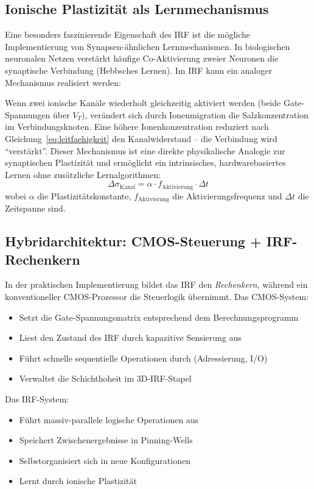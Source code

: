 ﻿\documentclass[a4paper,12pt]{scrreprt}
\theoremstyle{definition}
\begin{document}
\subsection{Ionische Plastizität als Lernmechanismus}

Eine besonders faszinierende Eigenschaft des IRF ist die mögliche Implementierung
von Synapsen-ähnlichen Lernmechanismen. In biologischen neuronalen Netzen
verstärkt häufige Co-Aktivierung zweier Neuronen die synaptische Verbindung
(Hebbsches Lernen). Im IRF kann ein analoger Mechanismus realisiert werden:

Wenn zwei ionische Kanäle wiederholt gleichzeitig aktiviert werden (beide
Gate-Span\-nungen über $V_T$), verändert sich durch Ionenmigration die
Salzkonzentration im Verbindungsknoten. Eine höhere Ionenkonzentration
reduziert nach Gleichung~\eqref{eq:leitfaehigkeit} den Kanalwiderstand --
die Verbindung wird ``verstärkt''. Dieser Mechanismus ist eine direkte
physikalische Analogie zur synaptischen Plastizität und ermöglicht
ein intrinsisches, hardwarebasiertes Lernen ohne zusätzliche
Lernalgorithmen:
\begin{equation}
	\Delta \sigma_{\mathrm{Kanal}} = \alpha \cdot f_{\mathrm{Aktivierung}} \cdot \Delta t
	\label{eq:ionische_plastizitaet}
\end{equation}
wobei $\alpha$ die Plastizitätskonstante, $f_{\mathrm{Aktivierung}}$ die
Aktivierungsfrequenz und $\Delta t$ die Zeitspanne sind.

\subsection{Hybridarchitektur: CMOS-Steuerung + IRF-Rechenkern}

In der praktischen Implementierung bildet das IRF den \emph{Rechenkern},
während ein konventioneller CMOS-Prozessor die Steuerlogik übernimmt.
Das CMOS-System:
\begin{itemize}
	\item Setzt die Gate-Spannungsmatrix entsprechend dem Berechnungsprogramm
	\item Liest den Zustand des IRF durch kapazitive Sensierung aus
	\item Führt schnelle sequentielle Operationen durch (Adressierung, I/O)
	\item Verwaltet die Schichthoheit im 3D-IRF-Stapel
\end{itemize}

Das IRF-System:
\begin{itemize}
	\item Führt massiv-parallele logische Operationen aus
	\item Speichert Zwischenergebnisse in Pinning-Wells
	\item Selbstorganisiert sich in neue Konfigurationen
	\item Lernt durch ionische Plastizität
\end{itemize}
\end{document}
